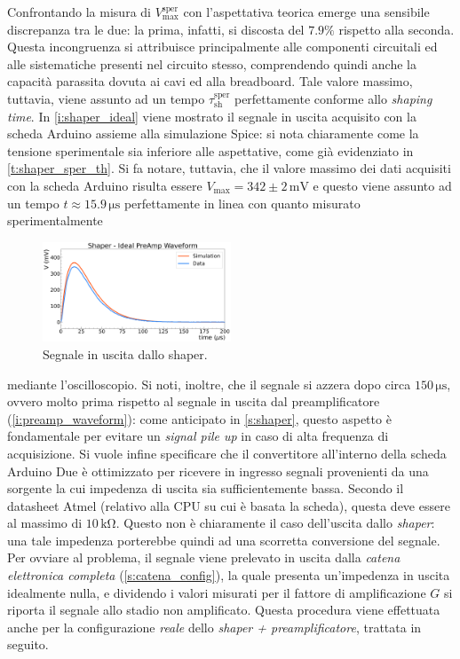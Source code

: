 \documentclass[a4paper,11pt]{article} %
\begin{document}
Confrontando la misura di $V_{\text{max}}^{\text{sper}}$ con l'aspettativa teorica emerge una sensibile discrepanza tra
le due: la prima, infatti, si discosta del $7.9\%$ rispetto alla seconda. Questa incongruenza si attribuisce
principalmente alle componenti circuitali ed alle sistematiche presenti nel circuito stesso, comprendendo quindi anche
la capacità parassita dovuta ai cavi ed alla breadboard. Tale valore massimo, tuttavia, viene assunto ad un tempo
$\tau_{\text{sh}}^{\text{sper}}$ perfettamente conforme allo \textit{shaping time}. In \autoref{i:shaper_ideal} viene
mostrato il segnale in uscita acquisito con la scheda Arduino assieme alla simulazione Spice: si nota chiaramente come
la tensione sperimentale sia inferiore alle aspettative, come già evidenziato in \autoref{t:shaper_sper_th}. Si fa
notare, tuttavia, che il valore massimo dei dati acquisiti con la scheda Arduino risulta essere $V_{\text{max}} = 342
\pm 2 \,\si{\milli\volt}$ e questo viene assunto ad un tempo $t \approx 15.9\,\si{\us}$ perfettamente in linea con
quanto misurato sperimentalmente

\begin{figure} 
	\centering 
	\includegraphics[width=0.5\textwidth]{../Plots/Shaper/shaper_ideal.png}
	\vspace{-20pt}
   \caption{\small Segnale in uscita dallo shaper.} 
   \label{i:shaper_ideal} 
\end{figure}

mediante l'oscilloscopio. Si noti, inoltre, che il segnale si azzera dopo circa $150\,\si{\us}$, ovvero molto prima
rispetto al segnale in uscita dal preamplificatore (\autoref{i:preamp_waveform}): come anticipato in \autoref{s:shaper},
questo aspetto è fondamentale per evitare un \textit{signal pile up} in caso di alta frequenza di acquisizione. Si vuole
infine specificare che il convertitore all'interno della scheda Arduino Due è ottimizzato per ricevere in ingresso
segnali provenienti da una sorgente la cui impedenza di uscita sia sufficientemente bassa. Secondo il datasheet Atmel
(relativo alla CPU su cui è basata la scheda), questa deve essere al massimo di $10\,\si{\kilo\ohm}$.%
Questo non è chiaramente il caso dell'uscita dallo \textit{shaper}: una tale
impedenza porterebbe quindi ad una scorretta conversione del segnale. Per ovviare al problema, il segnale viene
prelevato in uscita dalla \textit{catena elettronica completa} (\autoref{s:catena_config}), la quale presenta
un'impedenza in uscita idealmente nulla, e dividendo i valori misurati per il fattore di amplificazione $G$ si riporta
il segnale allo stadio non amplificato. Questa procedura viene effettuata anche per la configurazione \textit{reale}
dello \textit{shaper + preamplificatore}, trattata in seguito.
\end{document}
